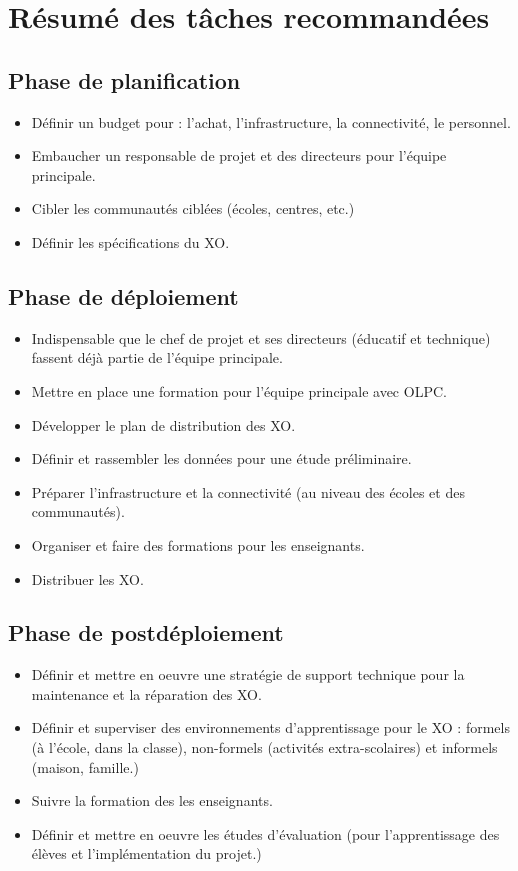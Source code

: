 \documentclass[12pt]{article}
\begin{document}
\section{Résumé des tâches recommandées}
\label{sec-11}
\subsection{Phase de planification}
\label{sec-11-1}


\begin{itemize}
\item Définir un budget pour : l'achat, l'infrastructure, la connectivité, le
  personnel.
\item Embaucher un responsable de projet et des directeurs pour l'équipe
  principale.
\item Cibler les communautés ciblées (écoles, centres, etc.)
\item Définir les spécifications du XO.
\end{itemize}
\subsection{Phase de déploiement}
\label{sec-11-2}


\begin{itemize}
\item Indispensable que le chef de projet et ses directeurs (éducatif et
  technique) fassent déjà partie de l'équipe principale.
\item Mettre en place une formation pour l'équipe principale avec OLPC.
\item Développer le plan de distribution des XO.
\item Définir et rassembler les données pour une étude préliminaire.
\item Préparer l'infrastructure et la connectivité (au niveau des écoles et des
  communautés).
\item Organiser et faire des formations pour les enseignants.
\item Distribuer les XO.
\end{itemize}
\subsection{Phase de postdéploiement}
\label{sec-11-3}


\begin{itemize}
\item Définir et mettre en oeuvre une stratégie de support technique pour la
  maintenance et la réparation des XO.
\item Définir et superviser des environnements d'apprentissage pour le XO :
  formels (à l'école, dans la classe), non-formels (activités
  extra-scolaires) et informels (maison, famille.)
\item Suivre la formation des les enseignants.
\item Définir et mettre en oeuvre les études d'évaluation (pour l'apprentissage
  des élèves et l'implémentation du projet.)
\end{itemize}
\end{document}
